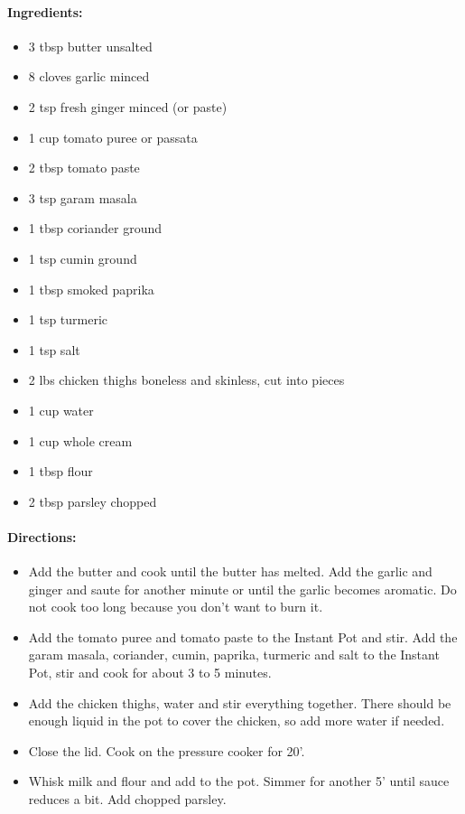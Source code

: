 \documentclass{article}
\begin{document}
\paragraph{Ingredients:}
\begin{itemize}
	\item 3 tbsp butter unsalted
	\item 8 cloves garlic minced
	\item 2 tsp fresh ginger minced (or paste)
	\item 1 cup tomato puree or passata
	\item 2 tbsp tomato paste
	\item 3 tsp garam masala
	\item 1 tbsp coriander ground
	\item 1 tsp cumin ground
	\item 1 tbsp smoked paprika
	\item 1 tsp turmeric
	\item 1 tsp salt
	\item 2 lbs chicken thighs boneless and skinless, cut into pieces
	\item 1 cup water
	\item 1 cup whole cream
	\item 1 tbsp flour
	\item 2 tbsp parsley chopped	
\end{itemize}

\paragraph{Directions:}
\begin{itemize}
	\item Add the butter and cook until the butter has melted. Add the garlic and ginger and saute for another
	minute or until the garlic becomes aromatic. Do not cook too long because you don’t want to burn it.
	\item Add the tomato puree and tomato paste to the Instant Pot and stir. Add the garam masala, coriander,
	cumin, paprika, turmeric and salt to the Instant Pot, stir and cook for about 3 to 5 minutes.
	\item Add the chicken thighs, water and stir everything together. There should be enough liquid in the pot to
	cover the chicken, so add more water if needed.
	\item Close the lid. Cook on the pressure cooker for 20’.
	\item Whisk milk and flour and add to the pot. Simmer for another 5’ until sauce reduces a bit. Add chopped
	parsley.	
\end{itemize}
\end{document}
